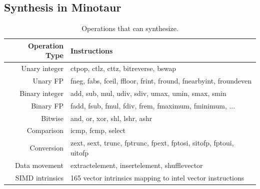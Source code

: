 \subsection{Synthesis in Minotaur}

\begin{table}[tbp]
  \centering
  \caption{Operations that \minotaur{} can synthesize.}
  \begin{tabular}{ r | l }
    \textbf{Operation Type} & \textbf{Instructions} \\
    \hline
    Unary integer & ctpop, ctlz, cttz, bitreverse, bswap \\
    Unary FP & fneg, fabs, fceil, ffloor, frint, fround, fnearbyint, froundeven \\
    Binary integer & add, sub, mul, udiv, sdiv, umax, umin, smax, smin\\
    Binary FP & fadd, fsub, fmul, fdiv, frem, fmaximum, fminimum, ... \\
    Bitwise & and, or, xor, shl, lshr, ashr \\
    Comparison & icmp, fcmp, select \\
    Conversion & zext, sext, trunc, fptrunc, fpext, fptosi, sitofp, fptoui, uitofp \\
    Data movement & extractelement, insertelement, shufflevector \\
    SIMD intrinsics & 165 vector intrinsics mapping to intel vector instructions \\
  \end{tabular}
  \label{tab:operations}
\end{table}

